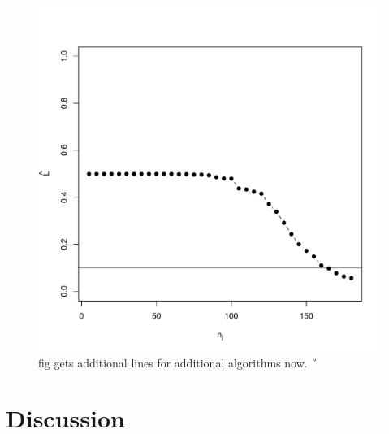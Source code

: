 \documentclass{article}
\begin{document}
% 

\begin{figure}[h!]
\centering 
\includegraphics[width=.5\linewidth]{Lhatplot}
\caption{fig gets additional lines for additional algorithms now.  %
˝}
\label{fig1}
\end{figure}



\section{Discussion} %
\label{sec:discussion}


\end{document}
